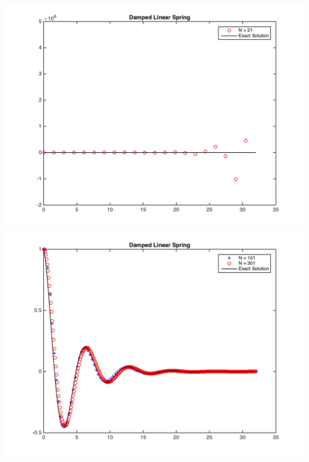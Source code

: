 \documentclass[11pt, oneside]{article}
\begin{document}
\begin{enumerate}
\begin{center}
      \includegraphics[scale=.4]{Figures/01_23.png}
      \includegraphics[scale=.7]{Figures/01_24.png}
    \end{center}

\end{enumerate}
\end{document}

